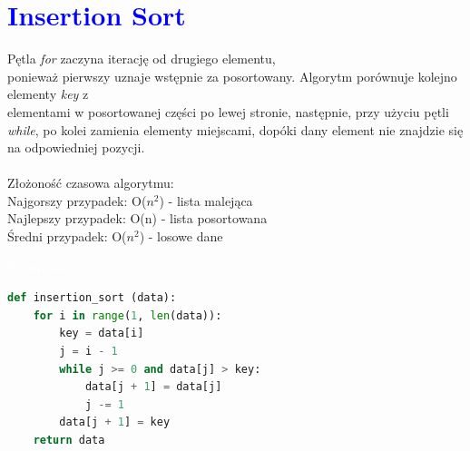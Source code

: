 \documentclass{article}
\begin{document}
	\section*{\textcolor{blue}{Insertion Sort}}
	\begin{multicols}{2}
		\noindent Pętla \textit{for} zaczyna iterację od drugiego elementu,\\ ponieważ pierwszy uznaje wstępnie za posortowany. Algorytm porównuje kolejno elementy \textit{key} z \\elementami w posortowanej części po lewej stronie, następnie, przy użyciu pętli \textit{while}, po kolei zamienia elementy miejscami, dopóki dany element nie znajdzie się na odpowiedniej pozycji.\\ \\Złożoność czasowa algorytmu: \\ Najgorszy przypadek: O($n^2$) - lista malejąca \\Najlepszy przypadek: O(n) - lista posortowana \\ Średni przypadek: O($n^2$) - losowe dane
		
		\noindent 
		\begin{tcolorbox}[colback=black,colframe=gray!50!,arc=3mm,boxrule=0pt,left=0pt,right=0pt,width=\linewidth]
			\textcolor{white}{\textbf{\textsf{Terminal}}}\\
			
			\begin{lstlisting}[language=Python]
def insertion_sort (data):
	for i in range(1, len(data)):
		key = data[i]
		j = i - 1
		while j >= 0 and data[j] > key:
			data[j + 1] = data[j]
			j -= 1
		data[j + 1] = key
	return data
			\end{lstlisting}
			
		\end{tcolorbox}
	\end{multicols}
	
	\newpage
	
\end{document}
